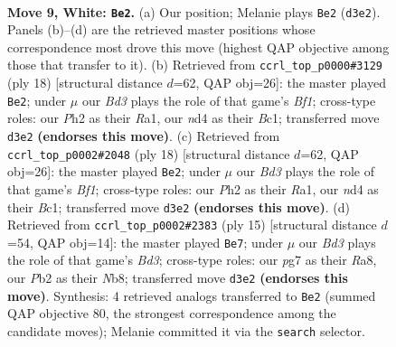 \documentclass[11pt]{article}
\begin{document}
\clearpage

\begin{figure}[p]\centering
\begin{subfigure}{0.46\textwidth}\centering
\resizebox{\linewidth}{!}{%
\newchessgame
\chessboard[
  setfen={r1bqkb1r/pp1n1ppp/4p3/3pP3/3n4/3B4/PP3PPP/R1BQKNNR w KQkq - 0 9},
  showmover=false,
  pgfstyle=straightmove, color=movearrow, markmove={d3-e2}
]}
\caption{}
\end{subfigure}\hfill
\begin{subfigure}{0.46\textwidth}\centering
\resizebox{\linewidth}{!}{%
\newchessgame
\chessboard[
  setfen={r2qkb1r/p1pb1ppp/2p5/2npP3/3N4/8/PPP2PPP/R1BQKB1R w KQkq - 2 10},
  showmover=false,
  pgfstyle=straightmove, color=movearrow, markmove={f1-e2}
]}
\caption{}
\end{subfigure}
\\[4pt]
\begin{subfigure}{0.46\textwidth}\centering
\resizebox{\linewidth}{!}{%
\newchessgame
\chessboard[
  setfen={r2qkb1r/p1pb1ppp/2p5/2npP3/3N4/8/PPP2PPP/R1BQKB1R w KQkq - 2 10},
  showmover=false,
  pgfstyle=straightmove, color=movearrow, markmove={f1-e2}
]}
\caption{}
\end{subfigure}\hfill
\begin{subfigure}{0.46\textwidth}\centering
\resizebox{\linewidth}{!}{%
\newchessgame
\chessboard[
  setfen={rn1qk2r/ppp2ppp/3bb3/8/2NPp3/2P5/PP3PPP/R1BQKB1R b KQkq - 0 8},
  showmover=false,
  pgfstyle=straightmove, color=movearrow, markmove={d6-e7}
]}
\caption{}
\end{subfigure}
\caption{\textbf{Move 9, White: \texttt{Be2}.} (a) Our position; Melanie plays \texttt{Be2} (\texttt{d3e2}). Panels (b)--(d) are the retrieved master positions whose correspondence most drove this move (highest QAP objective among those that transfer to it). (b) Retrieved from \texttt{ccrl\_top\_p0000\#3129} (ply 18) [structural distance $d$=62, QAP obj=26]: the master played \texttt{Be2}; under $\mu$ our \emph{Bd3} plays the role of that game's \emph{Bf1}; cross-type roles: our \emph{P}h2 as their \emph{R}a1, our \emph{n}d4 as their \emph{B}c1; transferred move \texttt{d3e2} \textbf{(endorses this move)}. (c) Retrieved from \texttt{ccrl\_top\_p0002\#2048} (ply 18) [structural distance $d$=62, QAP obj=26]: the master played \texttt{Be2}; under $\mu$ our \emph{Bd3} plays the role of that game's \emph{Bf1}; cross-type roles: our \emph{P}h2 as their \emph{R}a1, our \emph{n}d4 as their \emph{B}c1; transferred move \texttt{d3e2} \textbf{(endorses this move)}. (d) Retrieved from \texttt{ccrl\_top\_p0002\#2383} (ply 15) [structural distance $d$=54, QAP obj=14]: the master played \texttt{Be7}; under $\mu$ our \emph{Bd3} plays the role of that game's \emph{Bd3}; cross-type roles: our \emph{p}g7 as their \emph{R}a8, our \emph{P}b2 as their \emph{N}b8; transferred move \texttt{d3e2} \textbf{(endorses this move)}. Synthesis: 4 retrieved analogs transferred to \texttt{Be2} (summed QAP objective 80, the strongest correspondence among the candidate moves); Melanie committed it via the \texttt{search} selector.}
\label{fig:thought-m16}
\end{figure}
\end{document}
